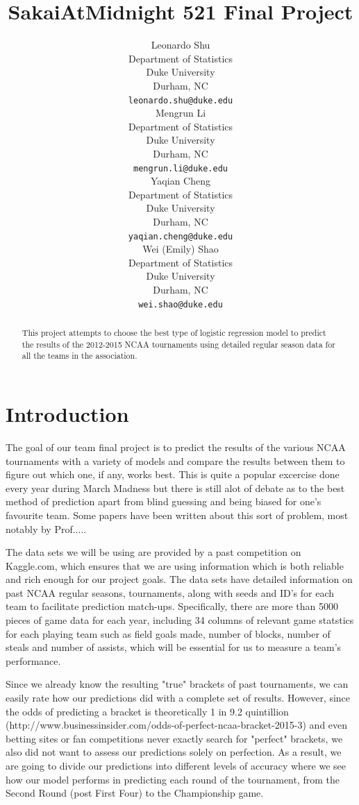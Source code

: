 \documentclass{article} %
\title{SakaiAtMidnight 521 Final Project}
\author{
  Leonardo Shu\\
  Department of Statistics\\
  Duke University\\
  Durham, NC \\
  \texttt{leonardo.shu@duke.edu} \\
  \And
  Mengrun Li \\
  Department of Statistics\\
  Duke University\\
  Durham, NC \\
  \texttt{mengrun.li@duke.edu} \\
  \AND
  Yaqian Cheng \\
  Department of Statistics\\
  Duke University\\
  Durham, NC \\
  \texttt{yaqian.cheng@duke.edu} \\
  \And
  Wei (Emily) Shao \\
  Department of Statistics\\
  Duke University\\
  Durham, NC \\
  \texttt{wei.shao@duke.edu} \\
}
\begin{document}
\maketitle

\begin{abstract}
This project attempts to choose the best type of logistic regression model to predict the results of the 2012-2015 NCAA tournaments using detailed regular season data for all the teams in the association.
\end{abstract}

\section{Introduction}

The goal of our team final project is to predict the results of the various NCAA tournaments with a variety of models and compare the results between them to figure out which one, if any, works best. This is quite a popular excercise done every year during March Madness but there is still alot of debate as to the best method of prediction apart from blind guessing and being biased for one's favourite team. Some papers have been written about this sort of problem, most notably by Prof.....

The data sets we will be using are provided by a past competition on Kaggle.com, which ensures that we are using information which is both reliable and rich enough for our project goals. The data sets have detailed information on past NCAA regular seasons, tournaments, along with seeds and ID's for each team to facilitate prediction match-ups. Specifically, there are more than 5000 pieces of game data for each year, including 34 columns of relevant game statstics for each playing team such as field goals made, number of blocks, number of steals and number of assists, which will be essential for us to measure a team's performance.

Since we already know the resulting "true" brackets of past tournaments, we can easily rate how our predictions did with a complete set of results. However, since the odds of predicting a bracket is theoretically 1 in 9.2 quintillion (http://www.businessinsider.com/odds-of-perfect-ncaa-bracket-2015-3) and even betting sites or fan competitions never exactly search for "perfect" brackets, we also did not want to assess our predictions solely on perfection. As a result, we are going to divide our predictions into different levels of accuracy where we see how our model performs in predicting each round of the tournament, from the Second Round (post First Four) to the Championship game.
\end{document}
